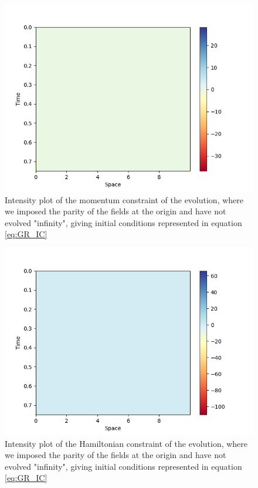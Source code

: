 \begin{figure}[t!]
    \centering
    \includegraphics[width=\columnwidth]{Images/adm_evolution-2nd_order-Momentum.png}
    \caption{Intensity plot of the momentum constraint of the evolution, where we imposed the parity of the fields at the origin and have not evolved "infinity", giving initial conditions represented in equation \eqref{eq:GR_IC}}
    \label{fig:momentum}
\end{figure}

\begin{figure}[t!]
    \centering
    \includegraphics[width=\columnwidth]{Images/adm_evolution-2nd_order-Hamiltonian.png}
    \caption{Intensity plot of the Hamiltonian constraint of the evolution, where we imposed the parity of the fields at the origin and have not evolved "infinity", giving initial conditions represented in equation \eqref{eq:GR_IC}}
    \label{fig:hamiltonian}
\end{figure}

